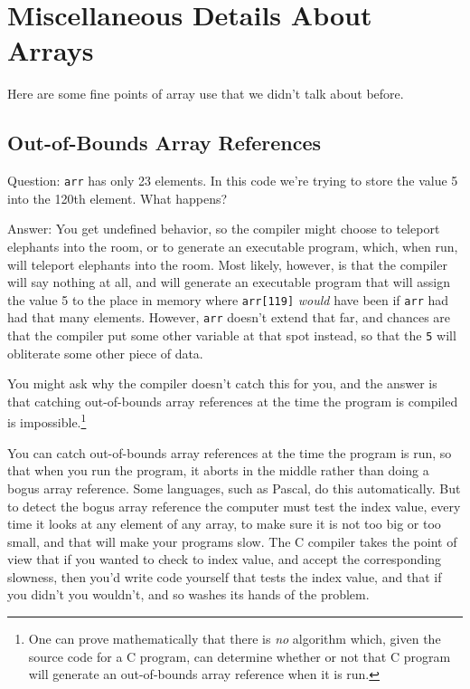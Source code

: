 %
%
%
\section{Miscellaneous Details About Arrays}

Here are some fine points of array use that we didn't talk about before.

\subsection{Out-of-Bounds Array References}

Question: {\tt arr} has only 23 elements.  In this code we're trying to
store the value 5 into the 120th element.  What happens?

\begin{flushleft}
\verb% . . . % \\*
\verb% int arr[23];% \\*
\verb% % \\*
\verb% arr[119] = 5;% 
\end{flushleft}

Answer: You get undefined behavior, so the compiler might choose to
teleport elephants into the room, or to generate an executable program,
which, when run, will teleport elephants into the room.  Most likely,
however, is that the compiler will say nothing at all, and will generate
an executable program that will assign the value 5 to the place in
memory where {\tt arr[119]} {\em would}\/ have been if {\tt arr} had had
that many elements.  However, {\tt arr} doesn't extend that far, and
chances are that the compiler put some other variable at that spot
instead, so that the {\tt 5} will obliterate some other piece of data.

You might ask why the compiler doesn't catch this for you, and the
answer is that catching out-of-bounds array references at the time the
program is compiled is impossible.\footnote{One can prove mathematically
that there is {\em no}\/ algorithm which, given the source code for a C
program, can determine whether or not that C program will generate an
out-of-bounds array reference when it is run.}

You can catch out-of-bounds array references at the time the program is
run, so that when you run the program, it aborts in the middle rather
than doing a bogus array reference.  Some languages, such as Pascal, do
this automatically.  But to detect the bogus array reference the
computer must test the index value, every time it looks at any element
of any array, to make sure it is not too big or too small, and that will
make your programs slow.  The C compiler takes the point of view that if
you wanted to check to index value, and accept the corresponding
slowness, then you'd write code yourself that tests the index value, and
that if you didn't you wouldn't, and so washes its hands of the problem.

